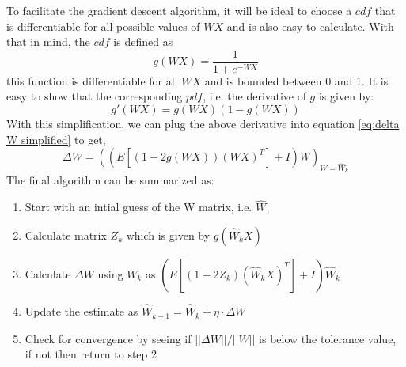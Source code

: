 \documentclass[journal,onecolumn,12pt]{IEEEtran}
\begin{document}
To facilitate the gradient descent algorithm, it will be ideal to choose a $cdf$ that is differentiable for all possible values of $WX$ and is also easy to calculate. With that in mind, the $cdf$ is defined as
\begin{equation*}
    g(WX) = \frac{1}{1+e^{-WX}}
\end{equation*}
this function is differentiable for all $WX$ and is bounded between 0 and 1. It is easy to show that the corresponding $pdf$, i.e. the derivative of $g$ is given by:
\begin{equation*}
    g'(WX) = g(WX)(1-g(WX))
\end{equation*}
With this simplification, we can plug the above derivative into equation \ref{eq:delta W simplified} to get,
\begin{equation}
    \Delta W = \left(\left(E\left[(1-2g(WX))(WX)^T\right] + I \right)W\right)_{W=\hat{W}_k}
\end{equation}
The final algorithm can be summarized as:
\begin{enumerate}
    \item Start with an intial guess of the W matrix, i.e. $\hat{W}_1$  
    \item Calculate matrix $Z_k$ which is given by $g(\hat{W}_kX)$
    \item Calculate $\Delta W$ using $W_k$ as $\left(E\left[(1-2Z_k)(\hat{W}_kX)^T\right] + I \right)\hat{W}_k$
    \item Update the estimate as $\hat{W}_{k+1} =\hat{W}_k + \eta\cdot\Delta W$
    \item Check for convergence by seeing if $||\Delta W||/||W||$ is below the tolerance value, if not then return to step 2
\end{enumerate}
\end{document}

